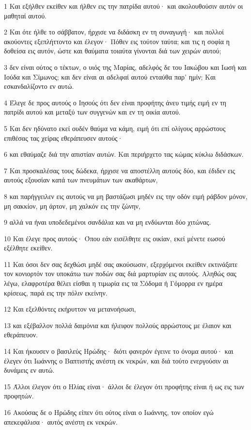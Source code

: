 \par 1 Και εξήλθεν εκείθεν και ήλθεν εις την πατρίδα αυτού· και ακολουθούσιν αυτόν οι μαθηταί αυτού.
\par 2 Και ότε ήλθε το σάββατον, ήρχισε να διδάσκη εν τη συναγωγή· και πολλοί ακούοντες εξεπλήττοντο και έλεγον· Πόθεν εις τούτον ταύτα; και τις η σοφία η δοθείσα εις αυτόν, ώστε και θαύματα τοιαύτα γίνονται διά των χειρών αυτού;
\par 3 δεν είναι ούτος ο τέκτων, ο υιός της Μαρίας, αδελφός δε του Ιακώβου και Ιωσή και Ιούδα και Σίμωνος; και δεν είναι αι αδελφαί αυτού ενταύθα παρ' ημίν; Και εσκανδαλίζοντο εν αυτώ.
\par 4 Έλεγε δε προς αυτούς ο Ιησούς ότι δεν είναι προφήτης άνευ τιμής ειμή εν τη πατρίδι αυτού και μεταξύ των συγγενών και εν τη οικία αυτού.
\par 5 Και δεν ηδύνατο εκεί ουδέν θαύμα να κάμη, ειμή ότι επί ολίγους αρρώστους επιθέσας τας χείρας εθεράπευσεν αυτούς·
\par 6 και εθαύμαζε διά την απιστίαν αυτών. Και περιήρχετο τας κώμας κύκλω διδάσκων.
\par 7 Και προσκαλέσας τους δώδεκα, ήρχισε να αποστέλλη αυτούς δύο, και έδιδεν εις αυτούς εξουσίαν κατά των πνευμάτων των ακαθάρτων,
\par 8 και παρήγγειλεν εις αυτούς να μη βαστάζωσι μηδέν εις την οδόν ειμή ράβδον μόνον, μη σακκίον, μη άρτον, μη χαλκόν εις την ζώνην,
\par 9 αλλά να ήναι υποδεδεμένοι σανδάλια και να μη ενδύωνται δύο χιτώνας.
\par 10 Και έλεγε προς αυτούς· Όπου εάν εισέλθητε εις οικίαν, εκεί μένετε εωσού εξέλθητε εκείθεν.
\par 11 Και όσοι δεν σας δεχθώσι μηδέ σας ακούσωσιν, εξερχόμενοι εκείθεν εκτινάξατε τον κονιορτόν τον υποκάτω των ποδών σας διά μαρτυρίαν εις αυτούς. Αληθώς σας λέγω, ελαφροτέρα θέλει είσθαι η τιμωρία εις τα Σόδομα ή Γόμορρα εν ημέρα κρίσεως, παρά εις την πόλιν εκείνην.
\par 12 Και εξελθόντες εκήρυττον να μετανοήσωσι,
\par 13 και εξέβαλλον πολλά δαιμόνια και ήλειφον πολλούς αρρώστους με έλαιον και εθεράπευον.
\par 14 Και ήκουσεν ο βασιλεύς Ηρώδης· διότι φανερόν έγεινε το όνομα αυτού· και έλεγεν ότι Ιωάννης ο Βαπτιστής ανέστη εκ νεκρών, και διά τούτο ενεργούσιν αι δυνάμεις εν αυτώ.
\par 15 Άλλοι έλεγον ότι ο Ηλίας είναι· άλλοι δε έλεγον ότι προφήτης είναι ή ως εις των προφητών.
\par 16 Ακούσας δε ο Ηρώδης είπεν ότι ούτος είναι ο Ιωάννης, τον οποίον εγώ απεκεφάλισα· αυτός ανέστη εκ νεκρών.
